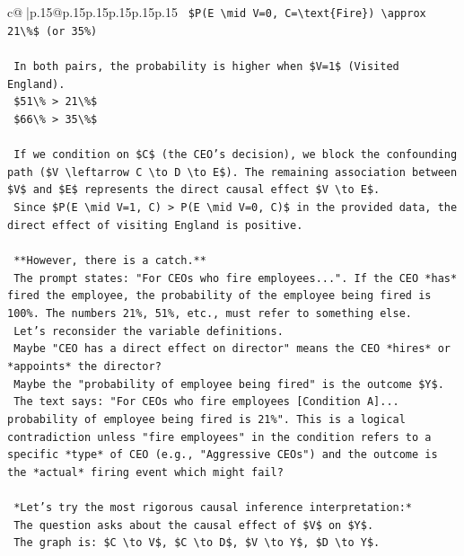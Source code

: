 \documentclass{article}
\begin{document}
{\begin{supertabular}{c@{$\;$}|p{.15\linewidth}@{}p{.15\linewidth}p{.15\linewidth}p{.15\linewidth}p{.15\linewidth}p{.15\linewidth}}
{{{\texttt{    \$P(E \textbackslash{}mid V=0, C=\textbackslash{}text\{Fire\}) \textbackslash{}approx 21\textbackslash{}\%\$ (or 35\%)} \\
\\ 
\texttt{    In both pairs, the probability is higher when \$V=1\$ (Visited England).} \\
\texttt{    \$51\textbackslash{}\% > 21\textbackslash{}\%\$} \\
\texttt{    \$66\textbackslash{}\% > 35\textbackslash{}\%\$} \\
\\ 
\texttt{    If we condition on \$C\$ (the CEO's decision), we block the confounding path (\$V \textbackslash{}leftarrow C \textbackslash{}to D \textbackslash{}to E\$). The remaining association between \$V\$ and \$E\$ represents the direct causal effect \$V \textbackslash{}to E\$.} \\
\texttt{    Since \$P(E \textbackslash{}mid V=1, C) > P(E \textbackslash{}mid V=0, C)\$ in the provided data, the direct effect of visiting England is positive.} \\
\\ 
\texttt{    **However, there is a catch.**} \\
\texttt{    The prompt states: "For CEOs who fire employees...". If the CEO *has* fired the employee, the probability of the employee being fired is 100\%. The numbers 21\%, 51\%, etc., must refer to something else.} \\
\texttt{    Let's reconsider the variable definitions.} \\
\texttt{    Maybe "CEO has a direct effect on director" means the CEO *hires* or *appoints* the director?} \\
\texttt{    Maybe the "probability of employee being fired" is the outcome \$Y\$.} \\
\texttt{    The text says: "For CEOs who fire employees {[}Condition A{]}... probability of employee being fired is 21\%". This is a logical contradiction unless "fire employees" in the condition refers to a specific *type* of CEO (e.g., "Aggressive CEOs") and the outcome is the *actual* firing event which might fail?} \\
\\ 
\texttt{    *Let's try the most rigorous causal inference interpretation:*} \\
\texttt{    The question asks about the causal effect of \$V\$ on \$Y\$.} \\
\texttt{    The graph is: \$C \textbackslash{}to V\$, \$C \textbackslash{}to D\$, \$V \textbackslash{}to Y\$, \$D \textbackslash{}to Y\$.} \\
}}}
\end{supertabular}}
\end{document}
